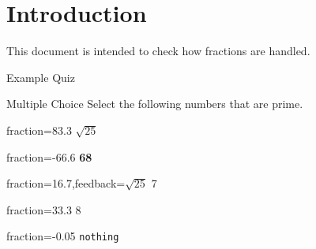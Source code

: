 \documentclass{article}
\begin{document}
\section*{Introduction}

This document is intended to check how fractions are handled.

\begin{quiz}{Example Quiz}

\begin{multi}[multiple,feedback={abc\\def 
$\sqrt{2}$}]{Multiple Choice}
Select the following numbers that are prime.
\item[fraction=83.3] $\sqrt{25}$
\item[fraction=-66.6] \textbf{68}
\item[fraction=16.7,feedback={$\sqrt{25}$}] 7
\item[fraction=33.3] 8
\item[fraction=-0.05] \texttt{nothing}
\end{multi}

\end{quiz}
\end{document}
